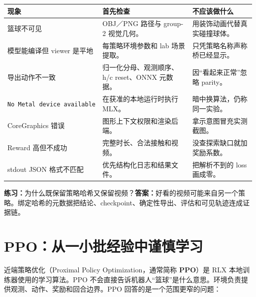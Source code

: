 \documentclass[
  chinese,
  11pt,
  letterpaper,
]{article}
\newcounter{none} %
\begin{document}
{\def\LTcaptype{none} %
\begin{longtable}[]{@{}
  >{\raggedright\arraybackslash}p{}
  >{\raggedright\arraybackslash}p{}
  >{\raggedright\arraybackslash}p{}@{}}
\toprule\noalign{}
\begin{minipage}[b]{\linewidth}\raggedright
现象
\end{minipage} & \begin{minipage}[b]{\linewidth}\raggedright
首先检查
\end{minipage} & \begin{minipage}[b]{\linewidth}\raggedright
不应该做什么
\end{minipage} \\
\midrule\noalign{}
\endhead
\bottomrule\noalign{}
\endlastfoot
篮球不可见 & OBJ／PNG 路径与 group-2 视觉几何。 &
用装饰动画代替真实碰撞球体。 \\
模型能编译但 viewer 是平地 & 每策略环境参数和 lab 场景提取。 &
只凭策略名称声称桥已经显示。 \\
导出动作不一致 & 归一化分母、观测顺序、h/c reset、ONNX 元数据。 &
因``看起来正常''忽略 parity。 \\
\texttt{No\ Metal\ device\ available} & 在获准的本地运行时执行 MLX。 &
暗中换算法，仍称同一实验。 \\
CoreGraphics 错误 & 图形上下文权限和渲染后端。 &
拿示意图冒充实测截图。 \\
Reward 高但不成功 & 完整时长、合法接触和视频。 &
没查探索缺口就加奖励系数。 \\
stdout JSON 格式不匹配 & 优先结构化日志和结果文件。 & 把解析不到的 loss
画成零。 \\
\end{longtable}
}

\textbf{练习：}为什么既保留策略哈希又保留视频？\textbf{答案：}好看的视频可能来自另一个策略。绑定哈希的元数据把结论、checkpoint、确定性导出、评估和可见轨迹连成证据链。

\section{PPO：从一小批经验中谨慎学习}\label{ppoux4eceux4e00ux5c0fux6279ux7ecfux9a8cux4e2dux8c28ux614eux5b66ux4e60}

近端策略优化（Proximal Policy Optimization，通常简称 \textbf{PPO}）是
RLX 本地训练器使用的学习算法。PPO
不会直接告诉机器人``篮球''是什么意思。环境负责提供观测、动作、奖励和回合边界。PPO
回答的是一个范围更窄的问题：
\end{document}
